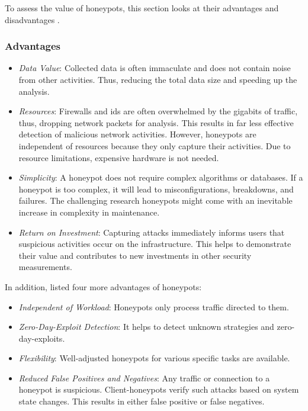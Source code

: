 To assess the value of honeypots, this section looks at their advantages and disadvantages \cite{Mokube2007,Kaur2014,Spitzner2003}.

\subsubsection{Advantages}

\begin{itemize}
    \item \textit{Data Value}: Collected data is often immaculate and does not contain noise from other activities.
          Thus, reducing the total data size and speeding up the analysis.
    \item \textit{Resources}: Firewalls and \ac{ids} are often overwhelmed by the gigabits of traffic, thus, dropping network packets for analysis.
          This results in far less effective detection of malicious network activities.
          However, honeypots are independent of resources because they only capture their activities.
          Due to resource limitations, expensive hardware is not needed.
    \item \textit{Simplicity}: A honeypot does not require complex algorithms or databases.
          If a honeypot is too complex, it will lead to misconfigurations, breakdowns, and failures.
          The challenging research honeypots might come with an inevitable increase in complexity in maintenance.
    \item \textit{Return on Investment}: Capturing attacks immediately informs users that suspicious activities occur on the infrastructure.
          This helps to demonstrate their value and contributes to new investments in other security measurements.
\end{itemize}

In addition, \citet{NawrockiWSKS2016} listed four more advantages of honeypots:

\begin{itemize}
    \item \textit{Independent of Workload}: Honeypots only process traffic directed to them.
    \item \textit{Zero-Day-Exploit Detection}: It helps to detect unknown strategies and zero-day-exploits.
    \item \textit{Flexibility}: Well-adjusted honeypots for various specific tasks are available.
    \item \textit{Reduced False Positives and Negatives}: Any traffic or connection to a honeypot is suspicious.
          Client-honeypots verify such attacks based on system state changes.
          This results in either false positive or false negatives.
\end{itemize}

